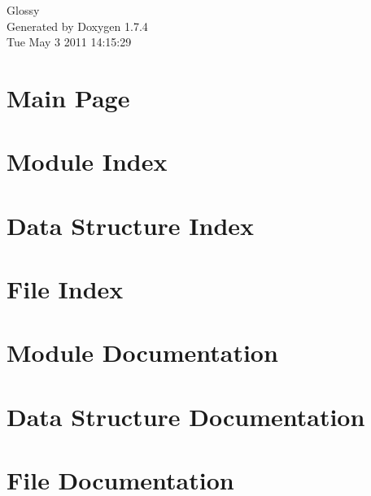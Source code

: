 \documentclass[a4paper]{book}
\begin{document}
\hypersetup{pageanchor=false}
\begin{titlepage}
\vspace*{7cm}
\begin{center}
{\Large Glossy }\\
\vspace*{1cm}
{\large Generated by Doxygen 1.7.4}\\
\vspace*{0.5cm}
{\small Tue May 3 2011 14:15:29}\\
\end{center}
\end{titlepage}
\clearemptydoublepage
{}
\tableofcontents
\clearemptydoublepage
{}
\hypersetup{pageanchor=true}
\chapter{Main Page}
\label{index}\hypertarget{index}{}
\chapter{Module Index}

\chapter{Data Structure Index}

\chapter{File Index}

\chapter{Module Documentation}



















\chapter{Data Structure Documentation}

\chapter{File Documentation}




\printindex
\end{document}
